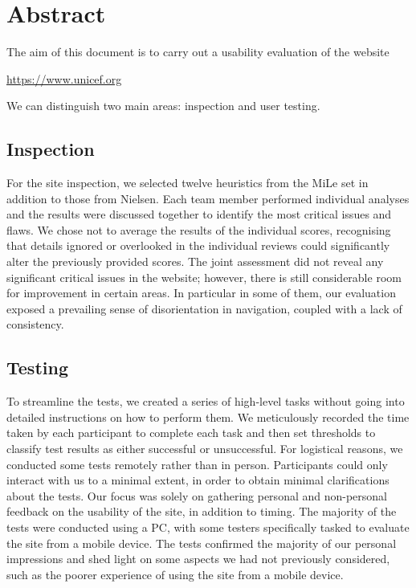 \section{Abstract}
The aim of this document is to carry out a usability evaluation of the website
\begin{center}
    \url{https://www.unicef.org}
\end{center}
We can distinguish two main areas: inspection and user testing. 
\subsection{Inspection}
For the site inspection, we selected twelve heuristics from the MiLe set in addition to those from Nielsen.
Each team member performed individual analyses and the results were discussed together to identify the most critical issues and flaws.
We chose not to average the results of the individual scores, recognising that details ignored or overlooked in the individual reviews could significantly alter the previously provided scores.
The joint assessment did not reveal any significant critical issues in the website; however, there is still considerable room for improvement in certain areas.
In particular in some of them, our evaluation exposed a prevailing sense of disorientation in navigation, coupled with a lack of consistency.

\subsection{Testing}
To streamline the tests, we created a series of high-level tasks without going into detailed instructions on how to perform them. 
We meticulously recorded the time taken by each participant to complete each task and then set thresholds to classify test results as either successful or unsuccessful. 
For logistical reasons, we conducted some tests remotely rather than in person.
Participants could only interact with us to a minimal extent, in order to obtain minimal clarifications about the tests.
Our focus was solely on gathering personal and non-personal feedback on the usability of the site, in addition to timing.
The majority of the tests were conducted using a PC, with some testers specifically tasked to evaluate the site from a mobile device.
The tests confirmed the majority of our personal impressions and shed light on some aspects we had not previously considered, such as the poorer experience of using the site from a mobile device.